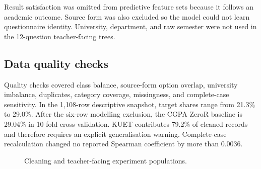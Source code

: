 Result satisfaction was omitted from predictive feature sets because it follows an academic outcome. Source form was also excluded so the model could not learn questionnaire identity. University, department, and raw semester were not used in the 12-question teacher-facing trees.

\subsection{Data quality checks}
Quality checks covered class balance, source-form option overlap, university imbalance, duplicates, category coverage, missingness, and complete-case sensitivity. In the 1,108-row descriptive snapshot, target shares range from 21.3\% to 29.0\%. After the six-row modelling exclusion, the CGPA ZeroR baseline is 29.04\% in 10-fold cross-validation. KUET contributes 79.2\% of cleaned records and therefore requires an explicit generalisation warning. Complete-case recalculation changed no reported Spearman coefficient by more than 0.0036.

\begin{figure}[H]\centering
{}
\caption{Cleaning and teacher-facing experiment populations.}
\label{fig:cleaning-flow}
\end{figure}
